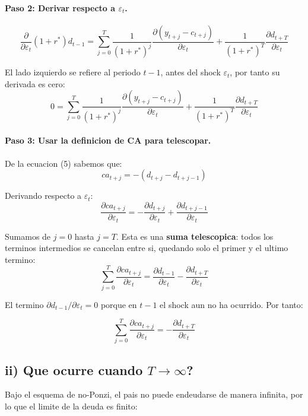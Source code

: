 \paragraph{Paso 2: Derivar respecto a $\varepsilon_t$.}

\[
    \frac{\partial}{\partial \varepsilon_t} (1+r^*) d_{t-1}
    = \sum_{j=0}^{T} \frac{1}{(1+r^*)^j} \frac{\partial(y_{t+j} - c_{t+j})}{\partial \varepsilon_t}
    + \frac{1}{(1+r^*)^T} \frac{\partial d_{t+T}}{\partial \varepsilon_t}
\]

El lado izquierdo se refiere al periodo $t-1$, antes del shock $\varepsilon_t$, por tanto su derivada es cero:
\[
    0 = \sum_{j=0}^{T} \frac{1}{(1+r^*)^j} \frac{\partial(y_{t+j} - c_{t+j})}{\partial \varepsilon_t}
    + \frac{1}{(1+r^*)^T} \frac{\partial d_{t+T}}{\partial \varepsilon_t}
\]

\paragraph{Paso 3: Usar la definicion de CA para telescopar.}

De la ecuacion (5) sabemos que:
\[
    ca_{t+j} = -(d_{t+j} - d_{t+j-1})
\]

Derivando respecto a $\varepsilon_t$:
\[
    \frac{\partial ca_{t+j}}{\partial \varepsilon_t}
    = -\frac{\partial d_{t+j}}{\partial \varepsilon_t} + \frac{\partial d_{t+j-1}}{\partial \varepsilon_t}
\]

Sumamos de $j=0$ hasta $j=T$. Esta es una \textbf{suma telescopica}: todos los terminos intermedios se cancelan entre si, quedando solo el primer y el ultimo termino:
\[
    \sum_{j=0}^{T} \frac{\partial ca_{t+j}}{\partial \varepsilon_t}
    = \frac{\partial d_{t-1}}{\partial \varepsilon_t} - \frac{\partial d_{t+T}}{\partial \varepsilon_t}
\]

El termino $\partial d_{t-1}/\partial \varepsilon_t = 0$ porque en $t-1$ el shock aun no ha ocurrido. Por tanto:

\begin{resultado}
\[
    \sum_{j=0}^{T} \frac{\partial ca_{t+j}}{\partial \varepsilon_t} = -\frac{\partial d_{t+T}}{\partial \varepsilon_t}
\]
\end{resultado}

\subsection*{ii) Que ocurre cuando $T \to \infty$?}

Bajo el esquema de no-Ponzi, el pais no puede endeudarse de manera infinita, por lo que el limite de la deuda es finito:

